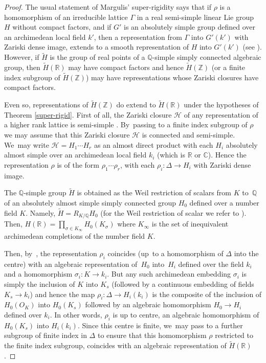 \documentclass[10pt,a4paper]{amsart}
\theoremstyle{definition}
\newcommand{\field}[1]{\mathbb{#1}}
\newcommand{\Q}{\field{Q}}
\newcommand{\R}{\field{R}}
\newcommand{\Z}{\field{Z}}
\newcommand{\C}{\field{C}}
\let\D\Delta
\let\s\sigma
\begin{document}
\begin{proof} The usual statement of Margulis' super-rigidity says that if $\rho$ is a homomorphism of an irreducible lattice $\Gamma $ in a real semi-simple linear Lie group $H$ without compact factors, and if $G'$ is an absolutely simple group defined over an archimedean local field $k'$, then a representation from $\Gamma $ into $G'(k')$ with Zariski dense image, extends to a smooth
representation of $H$ into $G'(k')$ (see \cite[Chap.\,VIII, Th.\,(C)]{M}). However, if $\tilde H$ is the group of
real points of a $\Q$-simple simply connected algebraic group, then $\tilde H(\R)$ may have compact factors and
hence $\tilde{H}(\Z)$ (or a finite index subgroup of $\tilde{H}(\Z)$) may have representations whose Zariski closures
have compact factors.

Even so, representations of $\tilde{H}(\Z)$ do extend to $\tilde H(\R)$ under the hypotheses of Theorem \ref{super-rigid}.
First of all, the Zariski closure $\mathcal H$ of any representation of a higher rank lattice is semi-simple \cite[Chap.\,VIII, Th.\,(3.10)]{M}. By~passing to a finite index subgroup of $\rho$ we may assume that this Zariski closure $\mathcal H$ is connected and semi-simple. We~may write $\mathcal H =H_1\cdots H_r$ as an almost direct product with each $H_i$ absolutely almost simple over an archimedean local field $k_i$ (which is $\R$ or $\C$). Hence the representation $\rho$ is of the form $\rho_1 \cdots \rho_r$, with each $\rho_i :\D \to H_i$ with Zariski dense image.

The $\Q$-simple group $\tilde{H}$ is obtained as the Weil restriction of scalars from $K$ to~$\Q$ of an absolutely almost simple simply connected group $H_0$ defined over a number field $K$. Namely, $\tilde{H}=R_{K/\Q}H_0$ (for the Weil restriction of scalar we refer to \cite[ Chap.\,6, p.\,115]{Z}). Then, $H(\R)=\prod_{\s \in K_\infty} H_0(K_\s)$ where $K_\infty$ is the set of inequivalent archimedean completions of the number field $K$.

Then, by~\cite[Chap.\,VIII, Th.\,(3.6)\,(ii)\,(a)]{M}, the representation $\rho_i$ coincides (up~to a homomorphism of $\D$ into the centre) with an algebraic representation of~$H_0$ into~$H_i$ defined over the field $k_i$ and a homomorphism $\s_i: K \to k_i$.
But any such archimedean embedding $\s_i$ is simply the inclusion of $K$ into $K_s$ (followed by a continuous embedding of fields $K_s \to k_i$) and hence the map $\rho_i :\D \to H_i(k_i)$ is the composite of the inclusion of $H_0(O_K)$ into $H_0(K_s)$ followed by an algebraic homomorphism $H_0 \to H_i$ defined over $k_i$.
In other words, $\rho_i$ is up to centre, an algebraic homomorphism of $H_0(K_s)$ into $H_i(k_i)$. Since this centre is finite, we~may pass to a further subgroup of finite index in $\D$ to ensure that this homomorphism $\rho $ restricted to the finite index subgroup, coincides with an algebraic representation of $\tilde H(\R)$.
\end{proof}
\end{document}
